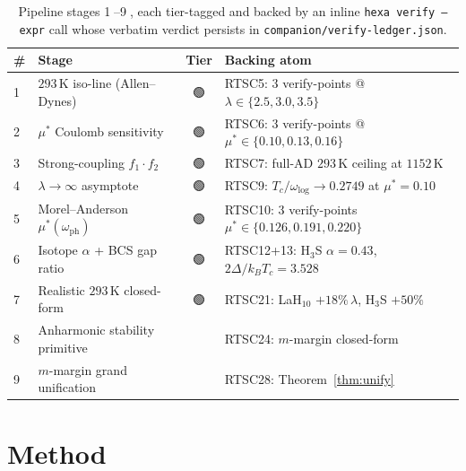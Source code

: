 \documentclass[11pt,a4paper]{article}
\providecommand{\tierBlue}{🔵}
\providecommand{\tierGreen}{🟢}
\begin{document}
\medskip
\begin{table}[h]
\centering
\small
\begin{tabular}{@{}>{\centering\arraybackslash}m{0.4cm} >{\raggedright\arraybackslash}m{4.6cm} c >{\raggedright\arraybackslash}m{6.5cm}@{}}
\toprule
\textbf{\#} & \textbf{Stage} & \textbf{Tier} & \textbf{Backing atom} \\
\midrule
\textcircled{\scriptsize 1} & $293$\,K iso-line (Allen--Dynes)    & \tierGreen & RTSC5: 3 verify-points @ $\lambda\in\{2.5,3.0,3.5\}$ \\
\textcircled{\scriptsize 2} & $\mu^*$ Coulomb sensitivity         & \tierGreen & RTSC6: 3 verify-points @ $\mu^*\in\{0.10,0.13,0.16\}$ \\
\textcircled{\scriptsize 3} & Strong-coupling $f_1\!\cdot\!f_2$    & \tierGreen & RTSC7: full-AD $293$\,K ceiling at $1152$\,K \\
\textcircled{\scriptsize 4} & $\lambda\!\to\!\infty$ asymptote     & \tierGreen & RTSC9: $T_c/\omega_{\log}\to 0.2749$ at $\mu^*\!=\!0.10$ \\
\textcircled{\scriptsize 5} & Morel--Anderson $\mu^*(\omega_{\text{ph}})$ & \tierGreen & RTSC10: 3 verify-points $\mu^*\in\{0.126,0.191,0.220\}$ \\
\textcircled{\scriptsize 6} & Isotope $\alpha$ + BCS gap ratio    & \tierGreen & RTSC12+13: H$_3$S $\alpha=0.43$, $2\Delta/k_BT_c=3.528$ \\
\textcircled{\scriptsize 7} & Realistic $293$\,K closed-form      & \tierGreen & RTSC21: LaH$_{10}$ $+18\%\,\lambda$, H$_3$S $+50\%$ \\
\textcircled{\scriptsize 8} & Anharmonic stability primitive      & \tierBlue  & RTSC24: $m$-margin closed-form \tierBlue \\
\textcircled{\scriptsize 9} & $m$-margin grand unification        & \tierBlue  & RTSC28: Theorem~\ref{thm:unify} \\
\bottomrule
\end{tabular}
\caption{Pipeline stages \textcircled{\scriptsize 1}--\textcircled{\scriptsize 9},
each tier-tagged and backed by an inline \texttt{hexa verify --expr} call
whose verbatim verdict persists in \texttt{companion/verify-ledger.json}.}
\label{tab:pipeline}
\end{table}

\section{Method}
\label{sec:method}
\end{document}
